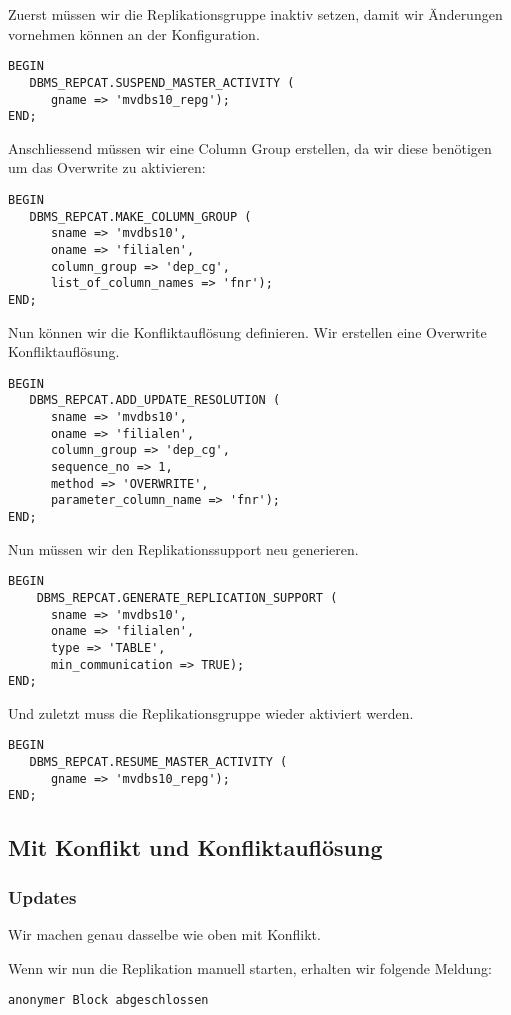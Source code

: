 \documentclass[11pt,a4paper,parskip=half]{scrartcl}
\begin{document}
Zuerst müssen wir die Replikationsgruppe inaktiv setzen, damit wir Änderungen vornehmen können an der Konfiguration.
\begin{lstlisting}
BEGIN
   DBMS_REPCAT.SUSPEND_MASTER_ACTIVITY (
      gname => 'mvdbs10_repg');
END;
\end{lstlisting}

Anschliessend müssen wir eine Column Group erstellen, da wir diese benötigen um das Overwrite zu aktivieren:
\begin{lstlisting}
BEGIN
   DBMS_REPCAT.MAKE_COLUMN_GROUP (
      sname => 'mvdbs10',
      oname => 'filialen',
      column_group => 'dep_cg',
      list_of_column_names => 'fnr');
END;
\end{lstlisting}

Nun können wir die Konfliktauflösung definieren. Wir erstellen eine Overwrite Konfliktauflösung.
\begin{lstlisting}
BEGIN
   DBMS_REPCAT.ADD_UPDATE_RESOLUTION (
      sname => 'mvdbs10',
      oname => 'filialen',
      column_group => 'dep_cg',
      sequence_no => 1,
      method => 'OVERWRITE',
      parameter_column_name => 'fnr');
END;
\end{lstlisting}

Nun müssen wir den Replikationssupport neu generieren.
\begin{lstlisting}
BEGIN 
    DBMS_REPCAT.GENERATE_REPLICATION_SUPPORT (
      sname => 'mvdbs10',
      oname => 'filialen', 
      type => 'TABLE',
      min_communication => TRUE); 
END;
\end{lstlisting}

Und zuletzt muss die Replikationsgruppe wieder aktiviert werden.
\begin{lstlisting}
BEGIN
   DBMS_REPCAT.RESUME_MASTER_ACTIVITY (
      gname => 'mvdbs10_repg');
END;
\end{lstlisting}

\subsection{Mit Konflikt und Konfliktauflösung}
\subsubsection{Updates}
Wir machen genau dasselbe wie oben mit Konflikt.

Wenn wir nun die Replikation manuell starten, erhalten wir folgende Meldung:
\begin{lstlisting}
anonymer Block abgeschlossen
\end{lstlisting}
\end{document}
